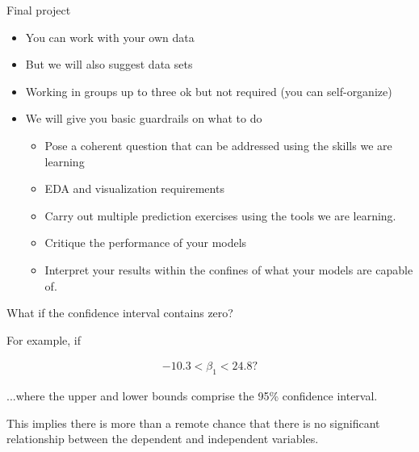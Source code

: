 \documentclass[aspectratio=169]{beamer}
\begin{document}
\begin{frame}{Final project}

\begin{itemize}
\item You can work with your own data
\item But we will also suggest data sets
\item Working in groups up to three ok but not required (you can self-organize)
\item We will give you basic guardrails on what to do
\begin{itemize}
\item Pose a coherent question that can be addressed using the skills we are learning
\item EDA and visualization requirements
\item Carry out multiple prediction exercises using the tools we are learning.
\item Critique the performance of your models
\item Interpret your results within the confines of what your models are capable of.
\end{itemize}
\end{itemize}

\end{frame}

\begin{frame}{What if the confidence interval contains zero?}

For example, if
   
\begin{align*}
  -10.3 < \beta_1 < 24.8?
\end{align*}

...where the upper and lower bounds comprise the 95\% confidence interval.

\pause

\vspace{5mm}
This implies there is more than a remote chance that there is no significant relationship between the dependent and independent variables.  

\end{frame}
\end{document}
